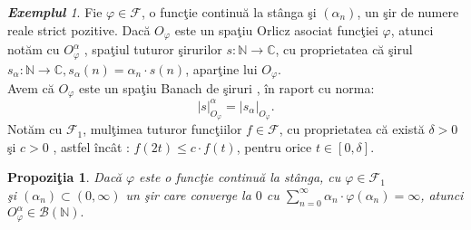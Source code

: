 \documentclass[ a4paper, 12pt]{report}
\newtheorem{prop}[theorem]{\bf Propozi\c tia }
\theoremstyle{definition}
\theoremstyle{remark}
\newtheorem{exemple}{\bf Exemplul}[section]
\numberwithin{equation}{section}
\begin{document}
\begin{exemple}
Fie $\varphi \in \mathcal{F}$, o func\c tie continu\u a la st\^anga \c si $(\alpha_n)$, un \c sir de numere reale strict pozitive. Dac\u a $O_\varphi$ este un spa\c tiu Orlicz asociat func\c tiei $\varphi$, atunci not\u am cu $O_\varphi^{\alpha}$ , spa\c tiul tuturor \c sirurilor $s : \mathbb{N} \rightarrow \mathbb{C}$, cu proprietatea c\u a \c sirul $s_{\alpha} : \mathbb{N} \rightarrow \mathbb{C}, s_{\alpha}(n) = \alpha_n \cdot s(n)$, apar\c tine lui $O_\varphi.$\\
Avem c\u a $O_\varphi$ este un spa\c tiu Banach de \c siruri , \^in raport cu norma:
\[\lvert s \rvert_{O_{\varphi}}^{\alpha} = \lvert s_{\alpha}\rvert_{O_{\varphi}}.\]
Not\u am cu $\mathcal{F}_{1}$, mul\c timea tuturor func\c tiilor $f \in \mathcal{F}$, cu proprietatea c\u a exist\u a $\delta > 0$ \c si $c>0$ , astfel \^inc\^at : $f(2t) \leq c \cdot f(t)$, pentru orice $t \in [0,\delta].$
\end{exemple}
\begin{prop}
Dac\u a $\varphi$ este o func\c tie continu\u a la st\^anga, cu $\varphi \in \mathcal{F}_{1}$ \\\c si $(\alpha_n) \subset (0,\infty)$ un \c sir care converge la $0$ cu $\sum\limits_{n=0}^{\infty} \alpha_n \cdot \varphi(\alpha_n) = \infty$,
 atunci $O_\varphi^{\alpha} \in \mathcal{B}(\mathbb{N}).$
\end{prop}
\end{document}
